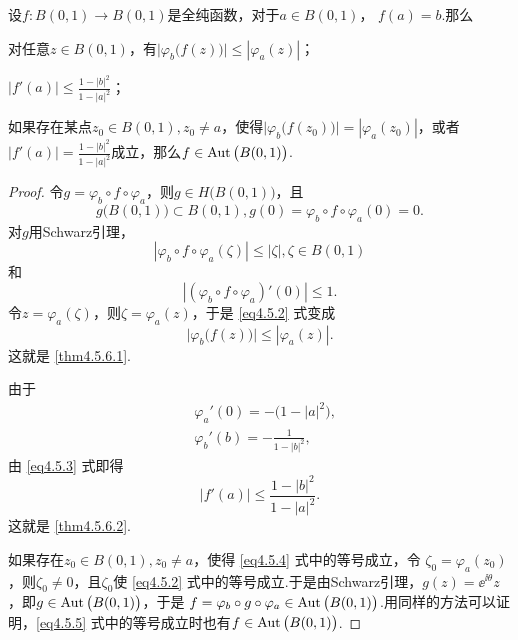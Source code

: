 \begin{theorem}\label{thm4.5.6}
  设$f:B(0,1)\to B(0,1)$是全纯函数，对于$a\in B(0,1)$，  $f(a)=b$.那么
  \begin{eenum}
    \item \label{thm4.5.6.1} 对任意$z\in B(0,1)$，有$\big|\varphi_b\big(f(z)\big)\big|
       \le|\varphi_a(z)|$；
    \item \label{thm4.5.6.2} $|f'(a)|\le\frac{1-|b|^2}{1-|a|^2}$；
    \item \label{thm4.5.6.3} 如果存在某点$z_0\in B(0,1),z_0\ne a$，使得$\big|\varphi_b\big(f(z_0)\big)\big|
        =|\varphi_a(z_0)|$，或者$|f'(a)|=\frac{1-|b|^2}{1-|a|^2}$成立，那么$f\in\operatorname{Aut}\big(B(0,1)\big)$.
  \end{eenum}
\end{theorem}
\begin{proof}
  令$g=\varphi_b\circ f\circ \varphi_a$，则$g\in H\big(B(0,1)\big)$，且
  \[
    g\big(B(0,1)\big)
    \subset B(0,1),g(0) = \varphi_b\circ f\circ \varphi_a(0)=0.
  \]
  对$g$用Schwarz引理，
  \begin{equation}\label{eq4.5.2}
    |\varphi_b\circ f\circ\varphi_a(\zeta)|\le|\zeta|,\zeta\in B(0,1)
  \end{equation}
  和
  \begin{equation}\label{eq4.5.3}
    |(\varphi_b\circ f\circ\varphi_a)'(0)|\le1.
  \end{equation}
  令$z=\varphi_a(\zeta)$，则$\zeta=\varphi_a(z)$，于是 \eqref{eq4.5.2} 式变成
  \begin{equation}\label{eq4.5.4}
    \big|\varphi_b\big(f(z)\big)\big| \le |\varphi_a(z)|.
  \end{equation}
  这就是 \ref{thm4.5.6.1}.

  由于
  \begin{align*}
    & \varphi_a'(0) = -\big(1-|a|^2\big),\\
    & \varphi_b'(b) = -\frac1{1-|b|^2},
  \end{align*}
  由 \eqref{eq4.5.3} 式即得
  \begin{equation}\label{eq4.5.5}
    |f'(a)| \le \frac{1-|b|^2}{1-|a|^2}.
  \end{equation}
  这就是 \ref{thm4.5.6.2}.

  如果存在$z_0\in B(0,1),z_0\ne a$，使得 \eqref{eq4.5.4} 式中的等号成立，令
  $\zeta_0=\varphi_a(z_0)$，则$\zeta_0\ne0$，且$\zeta_0$使 \eqref{eq4.5.2} 式中的等号成立.于是由Schwarz引理，$g(z)=\ee^{\ii\theta}z$，即$g\in \operatorname{Aut}\big(B(0,1)\big)$，于是
  $f=\varphi_b\circ g\circ\varphi_a\in \operatorname{Aut}\big(B(0,1)\big)$.用同样的方法可以证明，\eqref{eq4.5.5} 式中的等号成立时也有$f\in\operatorname{Aut}\big(B(0,1)\big)$.
\end{proof}


